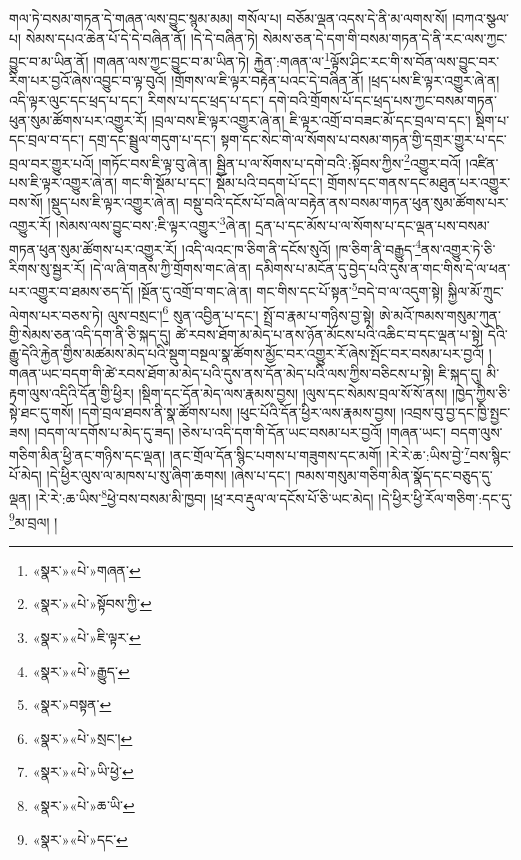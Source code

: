 གལ་ཏེ་བསམ་གཏན་དེ་གཞན་ལས་བྱུང་སྙམ་མམ། གསོལ་པ། བཅོམ་ལྡན་འདས་དེ་ནི་མ་ལགས་སོ། །བཀའ་སྩལ་པ། སེམས་དཔའ་ཆེན་པོ་དེ་དེ་བཞིན་ནོ། །དེ་དེ་བཞིན་ཏེ། སེམས་ཅན་དེ་དག་གི་བསམ་གཏན་དེ་ནི་རང་ལས་ཀྱང་བྱུང་བ་མ་ཡིན་ནོ། །གཞན་ལས་ཀྱང་བྱུང་བ་མ་ཡིན་ཏེ། རྐྱེན་:གཞན་ལ་\footnote{«སྣར་»«པེ་»གཞན་}ལྟོས་ཤིང་རང་གི་ས་བོན་ལས་བྱུང་བར་རིག་པར་བྱའོ་ཞེས་འབྱུང་བ་ལྟ་བུའོ། །གྲོགས་ལ་ཇི་ལྟར་བརྟེན་པའང་དེ་བཞིན་ནོ། །ཕྲད་པས་ཇི་ལྟར་འགྱུར་ཞེ་ན། འདི་ལྟར་ལུང་དང་ཕྲད་པ་དང་། རིགས་པ་དང་ཕྲད་པ་དང་། དགེ་བའི་གྲོགས་པོ་དང་ཕྲད་པས་ཀྱང་བསམ་གཏན་ཕུན་སུམ་ཚོགས་པར་འགྱུར་རོ། །བྲལ་བས་ཇི་ལྟར་འགྱུར་ཞེ་ན། ཇི་ལྟར་འགྲོ་བ་བཟང་མོ་དང་བྲལ་བ་དང་། སྡིག་པ་དང་བྲལ་བ་དང་། དགྲ་དང་སྦྲུལ་གདུག་པ་དང་། སྟག་དང་སེང་གེ་ལ་སོགས་པ་བསམ་གཏན་གྱི་དགྲར་གྱུར་པ་དང་བྲལ་བར་གྱུར་པའོ། །གཏོང་བས་ཇི་ལྟ་བུ་ཞེ་ན། སྦྱིན་པ་ལ་སོགས་པ་དགེ་བའི་:སྟོབས་ཀྱིས་\footnote{«སྣར་»«པེ་»སྟོབས་ཀྱི་}འགྱུར་བའོ། །འཛིན་པས་ཇི་ལྟར་འགྱུར་ཞེ་ན། གང་གི་སྡོམ་པ་དང་། སྡོམ་པའི་བདག་པོ་དང་། གྲོགས་དང་གནས་དང་མཐུན་པར་འགྱུར་བས་སོ། །སྡུད་པས་ཇི་ལྟར་འགྱུར་ཞེ་ན། བསྡུ་བའི་དངོས་པོ་བཞི་ལ་བརྟེན་ནས་བསམ་གཏན་ཕུན་སུམ་ཚོགས་པར་འགྱུར་རོ། །སེམས་ལས་བྱུང་བས་:ཇི་ལྟར་འགྱུར་\footnote{«སྣར་»«པེ་»ཇི་ལྟར་}ཞེ་ན། དྲན་པ་དང་མོས་པ་ལ་སོགས་པ་དང་ལྡན་པས་བསམ་གཏན་ཕུན་སུམ་ཚོགས་པར་འགྱུར་རོ། །འདི་ལའང་ཁ་ཅིག་ནི་དངོས་སུའོ། །ཁ་ཅིག་ནི་བརྒྱུད་\footnote{«སྣར་»«པེ་»རྒྱུད་}ནས་འགྱུར་ཏེ་ཅི་རིགས་སུ་སྦྱར་རོ། །དེ་ལ་ཞི་གནས་ཀྱི་གྲོགས་གང་ཞེ་ན། དམིགས་པ་མངོན་དུ་བྱེད་པའི་དུས་ན་གང་གིས་དེ་ལ་ཕན་པར་འགྱུར་བ་ཐམས་ཅད་དོ། །སྔོན་དུ་འགྲོ་བ་གང་ཞེ་ན། གང་གིས་དང་པོ་སྟན་\footnote{«སྣར་»བསྟན་}བདེ་བ་ལ་འདུག་སྟེ། སྐྱིལ་མོ་ཀྲུང་ལེགས་པར་བཅས་ཏེ། ལུས་བསྲང་།\footnote{«སྣར་»«པེ་»སྲང་།} སུན་འབྱིན་པ་དང་། སྤྲོ་བ་རྣམ་པ་གཉིས་བྱ་སྟེ། ཨེ་མའོ་ཁམས་གསུམ་ཀུན་གྱི་སེམས་ཅན་འདི་དག་ནི་ཅི་སྐད་དུ། ཚེ་རབས་ཐོག་མ་མེད་པ་ནས་ཉོན་མོངས་པའི་འཆིང་བ་དང་ལྡན་པ་སྟེ། དེའི་རྒྱུ་དེའི་རྐྱེན་གྱིས་མཚམས་མེད་པའི་སྡུག་བསྔལ་སྣ་ཚོགས་མྱོང་བར་འགྱུར་རོ་ཞེས་སྤོང་བར་བསམ་པར་བྱའོ། །གཞན་ཡང་བདག་གི་ཚེ་རབས་ཐོག་མ་མེད་པའི་དུས་ནས་དོན་མེད་པའི་ལས་ཀྱིས་བཅིངས་པ་སྟེ། ཇི་སྐད་དུ། མི་རྟག་ལུས་འདིའི་དོན་གྱི་ཕྱིར། །སྡིག་དང་དོན་མེད་ལས་རྣམས་བྱས། །ལུས་དང་སེམས་བྲལ་སོ་སོ་ནས། །ཁྱེད་ཀྱིས་ཅི་སྟེ་ཐང་དུ་གསོ། །དགེ་བྲལ་ཐབས་ནི་སྣ་ཚོགས་པས། །ཕུང་པོའི་དོན་ཕྱིར་ལས་རྣམས་བྱས། །འབྲས་བུ་བྱ་དང་ཁྱི་སྤྱང་ཟས། །བདག་ལ་དགོས་པ་མེད་དུ་ཟད། །ཅེས་པ་འདི་དག་གི་དོན་ཡང་བསམ་པར་བྱའོ། །གཞན་ཡང་། བདག་ལུས་གཅིག་མིན་ཕྱི་ནང་གཉིས་དང་ལྡན། །ནང་གྲོལ་དོན་སྙིང་པགས་པ་གཟུགས་དང་མགོ། །རེ་རེ་ཆ་:ཡིས་བྱེ་\footnote{«སྣར་»«པེ་»ཡི་ཕྱེ་}བས་སྙིང་པོ་མེད། །དེ་ཕྱིར་ལུས་ལ་མཁས་པ་སུ་ཞིག་ཆགས། །ཞེས་པ་དང་། ཁམས་གསུམ་གཅིག་མིན་སྣོད་དང་བཅུད་དུ་ལྡན། །རེ་རེ་:ཆ་ཡིས་\footnote{«སྣར་»«པེ་»ཆ་ཡི་}ཕྱེ་བས་བསམ་མི་ཁྱབ། །ཕྲ་རབ་རྡུལ་ལ་དངོས་པོ་ཅི་ཡང་མེད། །དེ་ཕྱིར་ཕྱི་རོལ་གཅིག་:དང་དུ་\footnote{«སྣར་»«པེ་»དང་}མ་བྲལ། །
